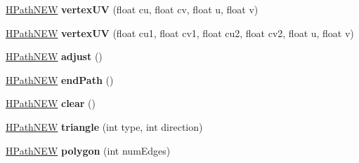 \begin{DoxyCompactItemize}
\item 
\hypertarget{classhype_1_1extended_1_1drawable_1_1_h_path_n_e_w_a2dcabe60a2c0a8cf2a55a8cc9897f371}{\hyperlink{classhype_1_1extended_1_1drawable_1_1_h_path_n_e_w}{H\-Path\-N\-E\-W} {\bfseries vertex\-U\-V} (float cu, float cv, float u, float v)}\label{classhype_1_1extended_1_1drawable_1_1_h_path_n_e_w_a2dcabe60a2c0a8cf2a55a8cc9897f371}

\item 
\hypertarget{classhype_1_1extended_1_1drawable_1_1_h_path_n_e_w_a2ada696ee3e2c48422c2450ad13cb8b7}{\hyperlink{classhype_1_1extended_1_1drawable_1_1_h_path_n_e_w}{H\-Path\-N\-E\-W} {\bfseries vertex\-U\-V} (float cu1, float cv1, float cu2, float cv2, float u, float v)}\label{classhype_1_1extended_1_1drawable_1_1_h_path_n_e_w_a2ada696ee3e2c48422c2450ad13cb8b7}

\item 
\hypertarget{classhype_1_1extended_1_1drawable_1_1_h_path_n_e_w_a27aede54c984b297ced7d9af292e0cac}{\hyperlink{classhype_1_1extended_1_1drawable_1_1_h_path_n_e_w}{H\-Path\-N\-E\-W} {\bfseries adjust} ()}\label{classhype_1_1extended_1_1drawable_1_1_h_path_n_e_w_a27aede54c984b297ced7d9af292e0cac}

\item 
\hypertarget{classhype_1_1extended_1_1drawable_1_1_h_path_n_e_w_a14de4c88266f227b9ebec5965cf1ca0b}{\hyperlink{classhype_1_1extended_1_1drawable_1_1_h_path_n_e_w}{H\-Path\-N\-E\-W} {\bfseries end\-Path} ()}\label{classhype_1_1extended_1_1drawable_1_1_h_path_n_e_w_a14de4c88266f227b9ebec5965cf1ca0b}

\item 
\hypertarget{classhype_1_1extended_1_1drawable_1_1_h_path_n_e_w_abc3ee5feba9c53a1ea67670be318d036}{\hyperlink{classhype_1_1extended_1_1drawable_1_1_h_path_n_e_w}{H\-Path\-N\-E\-W} {\bfseries clear} ()}\label{classhype_1_1extended_1_1drawable_1_1_h_path_n_e_w_abc3ee5feba9c53a1ea67670be318d036}

\item 
\hypertarget{classhype_1_1extended_1_1drawable_1_1_h_path_n_e_w_a8c7954ab75e0c71c9b7d639799fb3607}{\hyperlink{classhype_1_1extended_1_1drawable_1_1_h_path_n_e_w}{H\-Path\-N\-E\-W} {\bfseries triangle} (int type, int direction)}\label{classhype_1_1extended_1_1drawable_1_1_h_path_n_e_w_a8c7954ab75e0c71c9b7d639799fb3607}

\item 
\hypertarget{classhype_1_1extended_1_1drawable_1_1_h_path_n_e_w_a62cc6e1e47196e921d20010c4f3bc733}{\hyperlink{classhype_1_1extended_1_1drawable_1_1_h_path_n_e_w}{H\-Path\-N\-E\-W} {\bfseries polygon} (int num\-Edges)}\label{classhype_1_1extended_1_1drawable_1_1_h_path_n_e_w_a62cc6e1e47196e921d20010c4f3bc733}


\end{DoxyCompactItemize}

